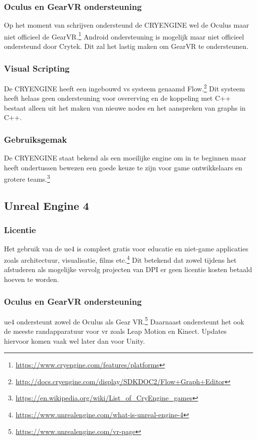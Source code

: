 \subsubsection{Oculus en GearVR ondersteuning}
Op het moment van schrijven ondersteund de CRYENGINE wel de Oculus maar niet officieel de GearVR.\footnote{\url{https://www.cryengine.com/features/platforms}} Android ondersteuning is mogelijk maar niet officieel ondersteund door Crytek. Dit zal het lastig maken om GearVR te ondersteunen.

\subsubsection{Visual Scripting}
De CRYENGINE heeft een ingebouwd \gls{vs} systeem genaamd Flow.\footnote{\url{http://docs.cryengine.com/display/SDKDOC2/Flow+Graph+Editor}} Dit systeem heeft helaas geen ondersteuning voor overerving en de koppeling met C++ bestaat alleen uit het maken van nieuwe nodes en het aanspreken van graphs in C++.

\subsubsection{Gebruiksgemak}
De CRYENGINE staat bekend als een moeilijke engine om in te beginnen maar heeft ondertussen bewezen een goede keuze te zijn voor game ontwikkelaars en grotere teams.\footnote{\url{https://en.wikipedia.org/wiki/List_of_CryEngine_games}}

\subsection{Unreal Engine 4}
\subsubsection{Licentie}
Het gebruik van de \gls{ue4} is compleet gratis voor educatie en niet-game applicaties zoals architectuur, visualisatie, films etc.\footnote{\url{https://www.unrealengine.com/what-is-unreal-engine-4}} Dit betekend dat zowel tijdens het afstuderen als mogelijke vervolg projecten van DPI er geen licentie kosten betaald hoeven te worden.

\subsubsection{Oculus en GearVR ondersteuning}
\gls{ue4} ondersteunt zowel de Oculus als Gear VR.\footnote{\url{https://www.unrealengine.com/vr-page}} Daarnaast ondersteunt het ook de meeste randapparatuur voor \gls{vr} zoals Leap Motion en Kinect. Updates hiervoor komen vaak wel later dan voor Unity.

